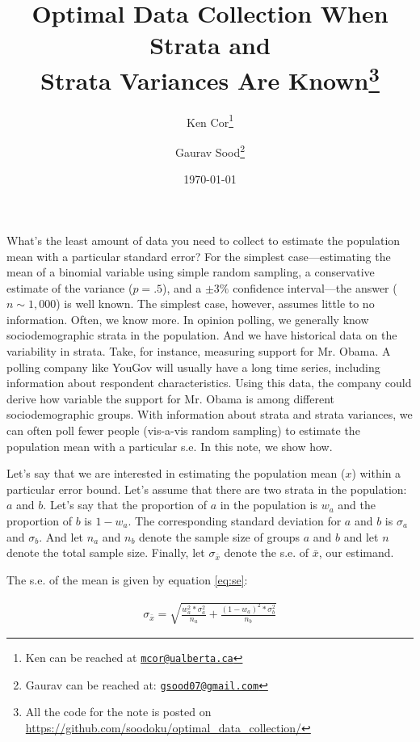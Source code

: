 \documentclass[12pt, letterpaper]{article}
\title{\Large{Optimal Data Collection When Strata and\\ Strata Variances Are Known}\footnote{All the code for the note is posted on \url{https://github.com/soodoku/optimal_data_collection/}}}
\author{Ken Cor\thanks{Ken can be reached at \href{mailto:mcor@ualberta.ca}{\footnotesize{\texttt{mcor@ualberta.ca}}}} \and Gaurav Sood\thanks{Gaurav can be reached at: \href{mailto:gsood07@gmail.com}{\footnotesize{\texttt{gsood07@gmail.com}}}}\vspace{.5cm}}
\date{\vspace{.5cm}\normalsize{\today}}
\begin{document}
\maketitle

\begin{comment}

setwd(paste0(githubdir, "optimal_data_collection/ms/"))
tools::texi2dvi("optimal_data_collection.tex", pdf = TRUE, clean = TRUE) 
setwd(githubdir)

\end{comment}

\doublespacing
What's the least amount of data you need to collect to estimate the population mean with a particular standard error? For the simplest case---estimating the mean of a binomial variable using simple random sampling, a conservative estimate of the variance ($p = .5$), and a $\pm3\%$ confidence interval---the answer ($n \sim 1,000$) is well known. The simplest case, however, assumes little to no information. Often, we know more. In opinion polling, we generally know sociodemographic strata in the population. And we have historical data on the variability in strata. Take, for instance, measuring support for Mr. Obama. A polling company like YouGov will usually have a long time series, including information about respondent characteristics. Using this data, the company could derive how variable the support for Mr. Obama is among different sociodemographic groups. With information about strata and strata variances, we can often poll fewer people (vis-a-vis random sampling) to estimate the population mean with a particular s.e. In this note, we show how.

Let's say that we are interested in estimating the population mean ($x$) within a particular error bound. Let's assume that there are two strata in the population: $a$ and $b$. Let's say that the proportion of $a$ in the population is $w_a$ and the proportion of $b$ is $1 - w_a$. The corresponding standard deviation for $a$ and $b$ is $\sigma_a$ and $\sigma_b$. And let $n_a$ and $n_b$ denote the sample size of groups $a$ and $b$ and let $n$ denote the total sample size. Finally, let $\sigma_{\bar{x}}$ denote the s.e. of $\bar{x}$, our estimand. 

The s.e. of the mean is given by equation \ref{eq:se}:

\begin{align}\label{eq:se}
\sigma_{\bar{x}} = \sqrt{\frac{w_a^2*\sigma_a^2}{n_a} + \frac{(1 - w_a)^2*\sigma_b^2}{n_b}}
\end{align}
\end{document}
